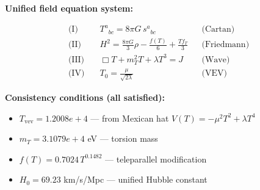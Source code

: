 
\textbf{Unified field equation system:}

\begin{align}
  \text{(I)} \quad & T^a{}_{bc} = 8\pi G \, s^a{}_{bc} && \text{(Cartan)} \\
  \text{(II)} \quad & H^2 = \frac{8\pi G}{3}\rho - \frac{f(T)}{6} + \frac{Tf_T}{3} && \text{(Friedmann)} \\
  \text{(III)} \quad & \Box T + m_T^2 T + \lambda T^3 = J && \text{(Wave)} \\
  \text{(IV)} \quad & T_0 = \frac{\mu}{\sqrt{2\lambda}} && \text{(VEV)}
\end{align}

\textbf{Consistency conditions (all satisfied):}
\begin{itemize}
  \item $T_{\text{vev}} = 1.2008e+4$ — from Mexican hat $V(T) = -\mu^2 T^2 + \lambda T^4$
  \item $m_T = 3.1079e+4$ eV — torsion mass
  \item $f(T) = 0.7024 \, T^{0.1482}$ — teleparallel modification
  \item $H_0 = 69.23$ km/s/Mpc — unified Hubble constant
\end{itemize}
